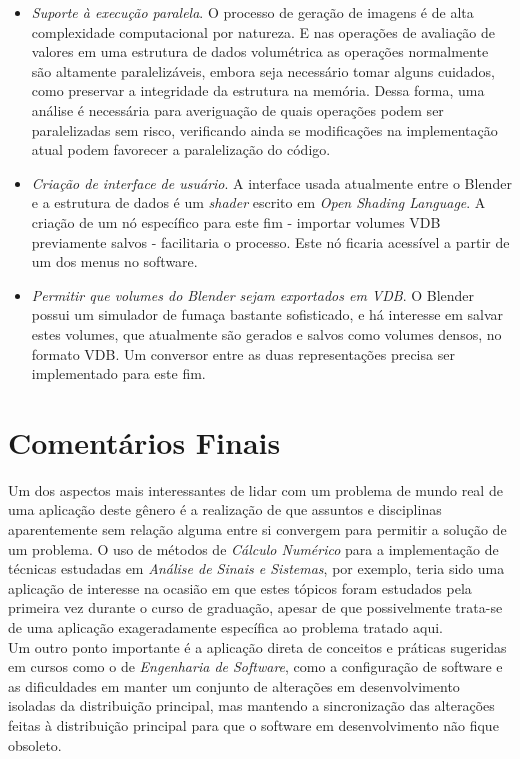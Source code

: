 \begin{itemize}
\item \emph{Suporte à execução paralela}.
O processo de geração de imagens é de alta complexidade computacional por natureza. E nas operações de avaliação de valores em uma estrutura de dados volumétrica as operações normalmente são altamente paralelizáveis, embora seja necessário tomar alguns cuidados, como preservar a integridade da estrutura na memória. Dessa forma, uma análise é necessária para averiguação de quais operações podem ser paralelizadas sem risco, verificando ainda se modificações na implementação atual podem favorecer a paralelização do código.

\item \emph{Criação de interface de usuário}. A interface usada atualmente entre o Blender e a estrutura de dados é um {\it shader} escrito em \emph{Open Shading Language}. A criação de um nó específico para este fim - importar volumes VDB previamente salvos - facilitaria o processo. Este nó ficaria acessível a partir de um dos menus no software.

\item \emph{Permitir que volumes do Blender sejam exportados em VDB}. O Blender possui um simulador de fumaça bastante sofisticado, e há interesse em salvar estes volumes, que atualmente são gerados e salvos como volumes densos, no formato VDB. Um conversor entre as duas representações precisa ser implementado para este fim.

\end{itemize}

\section{Comentários Finais}

Um dos aspectos mais interessantes de lidar com um problema de mundo real de uma aplicação deste gênero é a realização de que assuntos e disciplinas aparentemente sem relação alguma entre si convergem para permitir a solução de um problema. O uso de métodos de \emph{Cálculo Numérico} para a implementação de técnicas estudadas em \emph{Análise de Sinais e Sistemas}, por exemplo, teria sido uma aplicação de interesse na ocasião em que estes tópicos foram estudados pela primeira vez durante o curso de graduação, apesar de que possivelmente trata-se de uma aplicação exageradamente específica ao problema tratado aqui. \\

Um outro ponto importante é a aplicação direta de conceitos e práticas sugeridas em cursos como o de \emph{Engenharia de Software}, como a configuração de software e as dificuldades em manter um conjunto de alterações em desenvolvimento isoladas da distribuição principal, mas mantendo a sincronização das alterações feitas à distribuição principal para que o software em desenvolvimento não fique obsoleto. \\

